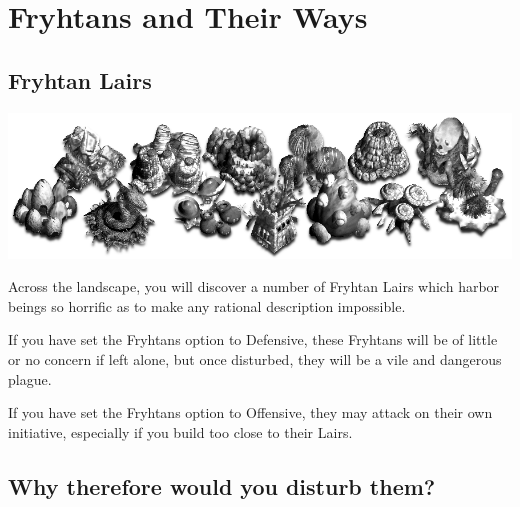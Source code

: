 
\chapter{Fryhtans and Their Ways}

\section{Fryhtan Lairs}

\begin{center}
	\includegraphics[width=0.7\linewidth]{Ilairs}
\end{center}

Across the landscape, you will discover a number of Fryhtan Lairs which harbor beings so horrific as to make any rational description impossible.

If you have set the Fryhtans option to Defensive, these Fryhtans will be of little or no concern if left alone, but once disturbed, they will be a vile and dangerous plague.

If you have set the Fryhtans option to Offensive, they may attack on their own initiative, especially if you build too close to their Lairs.

\section{Why therefore would you disturb them?}

